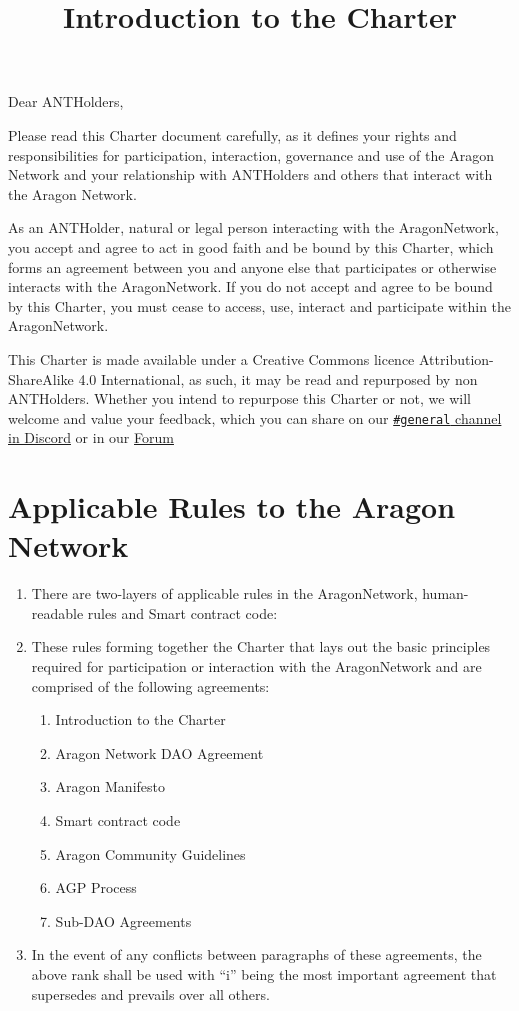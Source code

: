 
\title{Introduction to the Charter}



\mytitle

Dear \glspl{ANTHolder},

Please read this Charter document carefully, as it defines your rights and responsibilities for participation, interaction, governance and use of the Aragon Network and your relationship with \glspl{ANTHolder} and others that interact with the Aragon Network.

As an \gls{ANTHolder}, natural or legal person interacting with the \gls{AragonNetwork}, you accept and agree to act in good faith and be bound by this Charter, which forms an agreement between you and anyone else that participates or otherwise interacts with the \gls{AragonNetwork}.
If you do not accept and agree to be bound by this Charter, you must cease to access, use, interact and participate within the \gls{AragonNetwork}.

This Charter is made available under a Creative Commons licence Attribution-Share\-Alike 4.0 International, as such, it may be read and repurposed by non \glspl{ANTHolder}.
Whether you intend to repurpose this Charter or not, we will welcome and value your feedback, which you can share on our \href{https://discord.com/invite/eqQJkdp}{\texttt{\#general} channel in Discord} or in our \href{https://forum.aragon.org/}{Forum} 


\section{Applicable Rules to the Aragon Network}

\begin{enumerate}
	\item There are two-layers of applicable rules in the \gls{AragonNetwork}, human-readable rules and Smart contract code:
	\item These rules forming together the Charter that lays out the basic principles required for participation or interaction with the \gls{AragonNetwork} and are comprised of the following agreements:
	\begin{enumerate}
		\item Introduction to the Charter
		\item Aragon Network \ac{DAO} Agreement
		\item Aragon Manifesto
		\item Smart contract code
		\item Aragon Community Guidelines
		\item \ac{AGP} Process
		\item Sub-DAO Agreements
	\end{enumerate}
	\item In the event of any conflicts between paragraphs of these agreements, the above
	rank shall be used with “i” being the most important agreement that supersedes and prevails over all others.
\end{enumerate}


